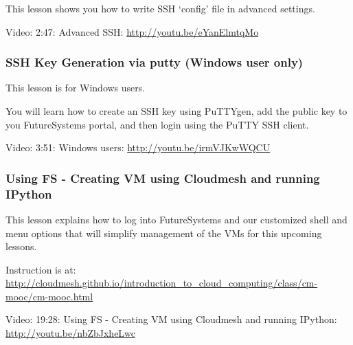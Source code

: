 This lesson shows you how to write SSH `config' file in advanced
settings.

Video: 2:47: Advanced SSH: \url{http://youtu.be/eYanElmtqMo}

\subsubsection{SSH Key Generation via putty (Windows user
only)}\label{ssh-key-generation-via-putty-windows-user-only}

This lesson is for Windows users.

You will learn how to create an SSH key using PuTTYgen, add the public
key to you FutureSystems portal, and then login using the PuTTY SSH
client.

Video: 3:51: Windows users: \url{http://youtu.be/irmVJKwWQCU}

\subsubsection{Using FS - Creating VM using Cloudmesh and running
IPython}\label{using-fs---creating-vm-using-cloudmesh-and-running-ipython}

This lesson explains how to log into FutureSystems and our customized
shell and menu options that will simplify management of the VMs for this
upcoming lessons.

Instruction is at:
\url{http://cloudmesh.github.io/introduction_to_cloud_computing/class/cm-mooc/cm-mooc.html}

Video: 19:28: Using FS - Creating VM using Cloudmesh and running
IPython: \url{http://youtu.be/nbZbJxheLwc}
